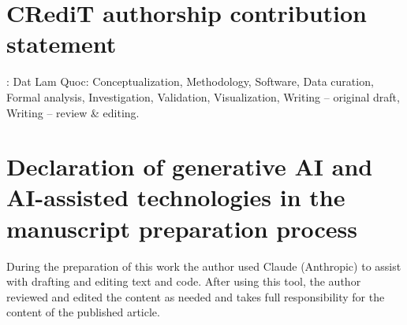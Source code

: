 \documentclass[review,12pt]{elsarticle}
\begin{document}
\section*{CRediT authorship contribution statement}
\ifdefined{}:
\else
Dat Lam Quoc:
\fi
Conceptualization, Methodology, Software, Data curation, Formal
analysis, Investigation, Validation, Visualization, Writing -- original
draft, Writing -- review \& editing.

\section*{Declaration of generative AI and AI-assisted technologies
in the manuscript preparation process}
During the preparation of this work the author used Claude
(Anthropic) to assist with drafting and editing text and code. After
using this tool, the author reviewed and edited the content as needed
and takes full responsibility for the content of the published
article.



\end{document}
